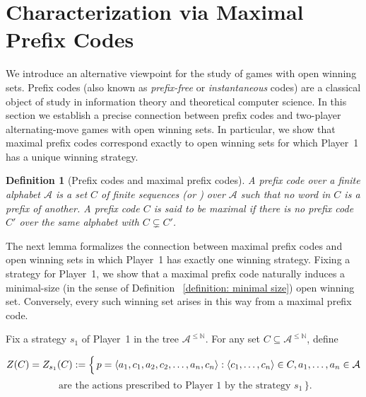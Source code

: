 \documentclass[a4,12pt]{article}%
\newtheorem{definition}[theorem]{Definition}
\newcommand{\N}{\mathbb{N}}
\begin{document}
\section{Characterization via Maximal Prefix Codes} \label{Section: max prefix codes}

We introduce an alternative viewpoint for the study of games with open winning sets.
Prefix codes (also known as \emph{prefix-free} or \emph{instantaneous} codes) are a classical object of study in information theory and theoretical computer science. In this section we establish a precise connection between prefix codes and two-player alternating-move games with open winning sets. In particular, we show that maximal prefix codes correspond exactly to open winning sets for which Player~1 has a unique winning strategy. 

\begin{definition}[Prefix codes and maximal prefix codes] \label{def of prefix codes}
A \emph{prefix code} over a finite alphabet $\mathcal{A}$ is a set $C$ of finite sequences (or ) over $\mathcal{A}$ such that no word in $C$ is a prefix of another. A prefix code $C$ is said to be \emph{maximal} if there is no prefix code $C'$ over the same alphabet with $C \subsetneq C'$.
\end{definition}

The next lemma formalizes the connection between maximal prefix codes and open winning sets in which Player~1 has exactly one winning strategy. Fixing a strategy for Player~1, we show that a maximal prefix code naturally induces a minimal-size (in the sense of Definition ~\ref{definition: minimal size}) open winning set. Conversely, every such winning set arises in this way from a maximal prefix code.

\medskip


Fix a strategy $s_1$ of Player~1 in the tree $\mathcal{A}^{\le \N}$. For any set $C \subseteq \mathcal{A}^{\leq \N}$, define

\medskip 

\[Z(C)= Z_{s_1}(C) := \Bigl\{\,  p = \langle a_1, c_1, a_2, c_2, \dots, a_n, c_n \rangle : \langle c_1, \dots, c_n \rangle \in C, a_1,\dots ,a_n \in \mathcal{A}\]
\[\text{ are the actions prescribed to Player~1 by the strategy } s_1 \,\Bigr\}.
\]
     
\end{document}
